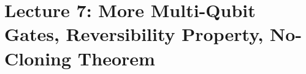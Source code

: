 \section{Lecture 7:  More Multi-Qubit Gates, Reversibility Property,
No-Cloning Theorem}\label{sec:Lecture 7}


